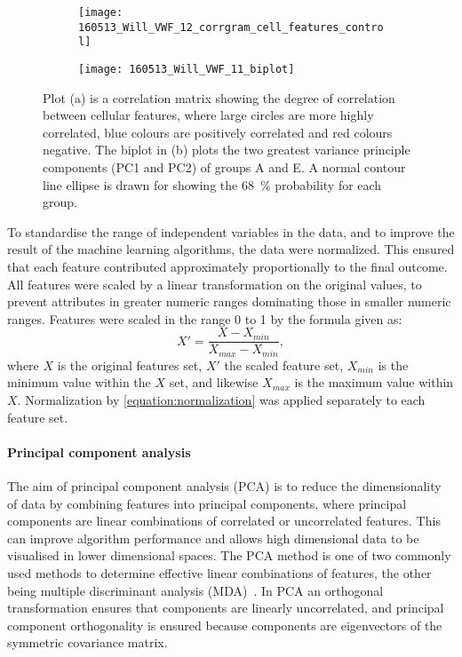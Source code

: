 \begin{figure}[!htbp]
	\centering
	\begin{subfigure}[b]{0.73\linewidth}
		\texttt{[image: 160513\_Will\_VWF\_12\_corrgram\_cell\_features\_control]}
		\caption{}
		\label{figure:cell_classification:corrgram}
	\end{subfigure}
	\begin{subfigure}[b]{0.73\linewidth}
		\texttt{[image: 160513\_Will\_VWF\_11\_biplot]}
		\caption{}
		\label{figure:cell_classification:ggbiplot}
	\end{subfigure}
	\caption[Correlation matrix cellular features plot and biplot of PCA]{Plot (a) is a correlation matrix showing the degree of correlation between cellular features, where large circles are more highly correlated, blue colours are positively correlated and red colours negative. The biplot in (b) plots the two greatest variance principle components (PC1 and PC2) of groups A and E. A normal contour line ellipse is drawn for showing the 68~$\%$ probability for each group.}
	\label{figure:cell_classification:feature_selection_and_PCA}
\end{figure}

To standardise the range of independent variables in the data, and to improve the result of the machine learning algorithms, the data were normalized. This ensured that each feature contributed approximately proportionally to the final outcome. All features were scaled by a linear transformation on the original values, to prevent attributes in greater numeric ranges dominating those in smaller numeric ranges. Features were scaled in the range 0 to 1 by the formula given as:
\begin{equation}
	X' = \frac{X - X_{min}}{X_{max}-X_{min}}, 
	\label{equation:normalization}
\end{equation}
where $X$ is the original features set, $X'$ the scaled feature set, $X_{min}$ is the minimum value within the $X$ set, and likewise $X_{max}$ is the maximum value within $X$. Normalization by \autoref{equation:normalization} was applied separately to each feature set.

\paragraph{Principal component analysis}
The aim of principal component analysis (PCA) is to reduce the dimensionality of data by combining features into principal components, where principal components are linear combinations of correlated or uncorrelated features. This can improve algorithm performance and allows high dimensional data to be visualised in lower dimensional spaces. The PCA method is one of two commonly used methods to determine effective linear combinations of features, the other being multiple discriminant analysis (MDA)~\cite{Duda2000}. In PCA an orthogonal transformation ensures that components are linearly uncorrelated, and principal component orthogonality is ensured because components are eigenvectors of the symmetric covariance matrix.

